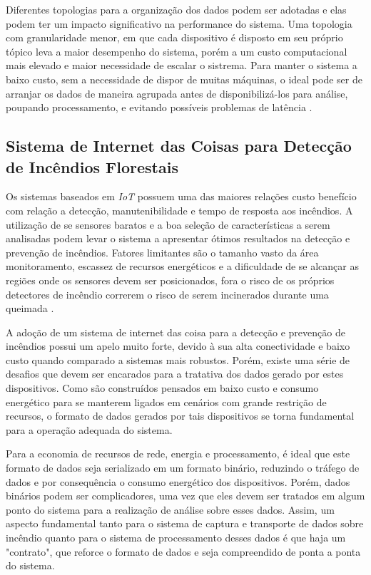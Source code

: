 \documentclass[12pt]{article}
\begin{document}
Diferentes topologias para a organização dos dados podem ser adotadas e elas podem ter um impacto significativo na performance do sistema. Uma topologia com granularidade menor, em que cada dispositivo é disposto em seu próprio tópico leva a maior desempenho do sistema, porém a um custo computacional mais elevado e maior necessidade de escalar o sistrema. Para manter o sistema a baixo custo, sem a necessidade de dispor de muitas máquinas, o ideal pode ser de arranjar os dados de maneira agrupada antes de disponibilizá-los para análise, poupando processamento, e evitando possíveis problemas de latência \cite{dey:18}.

\subsection{Sistema de Internet das Coisas para Detecção de Incêndios Florestais}
Os sistemas baseados em \textit{IoT} possuem uma das maiores relações custo benefício com relação a detecção, manutenibilidade e tempo de resposta aos incêndios. A utilização de se sensores baratos e a boa seleção de características a serem analisadas podem levar o sistema a apresentar ótimos resultados na detecção e prevenção de incêndios. Fatores limitantes são o tamanho vasto da área monitoramento, escassez de recursos energéticos e a dificuldade de se alcançar as regiões onde os sensores devem ser posicionados, fora o risco de os próprios detectores de incêndio correrem o risco de serem incinerados durante uma queimada \cite{albuquerque:20}.

A adoção de um sistema de internet das coisa para a detecção e prevenção de incêndios possui um apelo muito forte, devido à sua alta conectividade e baixo custo quando comparado a sistemas mais robustos. Porém, existe uma série de desafios que devem ser encarados para a tratativa dos dados gerado por estes dispositivos. Como são construídos pensados em baixo custo e consumo energético para se manterem ligados em cenários com grande restrição de recursos, o formato de dados gerados por tais dispositivos se torna fundamental para a operação adequada do sistema.

Para a economia de recursos de rede, energia e processamento, é ideal que este formato de dados seja serializado em um formato binário, reduzindo o tráfego de dados e por consequência o consumo energético dos dispositivos. Porém, dados binários podem ser complicadores, uma vez que eles devem ser tratados em algum ponto do sistema para a realização de análise sobre esses dados. Assim, um aspecto fundamental tanto para o sistema de captura e transporte de dados sobre incêndio quanto para o sistema de processamento desses dados é que haja um "contrato", que reforce o formato de dados e seja compreendido de ponta a ponta do sistema.
\end{document}
